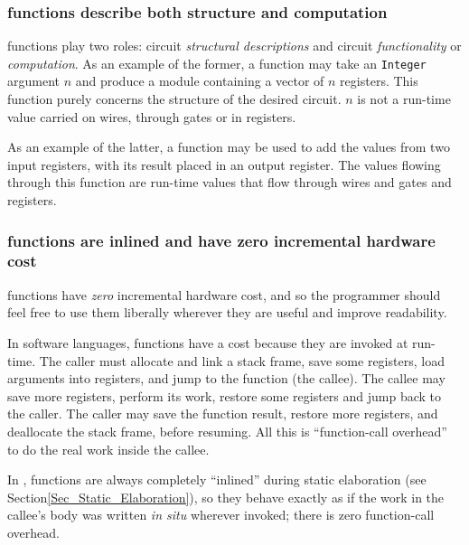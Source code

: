 
\subsubsection{{\BSV} functions describe both structure and computation}


{\BSV} functions play two roles: circuit \emph{structural
descriptions} and circuit \emph{functionality} or \emph{computation}.
As an example of the former, a {\BSV} function may take an
\verb|Integer| argument $n$ and produce a module containing a vector
of $n$ registers.  This function purely concerns the structure of the
desired circuit.  $n$ is not a run-time value carried on wires,
through gates or in registers.

As an example of the latter, a {\BSV} function may be used to add the
values from two input registers, with its result placed in an output
register.  The values flowing through this function are run-time
values that flow through wires and gates and registers.


\subsubsection{{\BSV} functions are inlined and have zero incremental hardware cost}


{\BSV} functions have \emph{zero} incremental hardware cost, and so
the programmer should feel free to use them liberally wherever they
are useful and improve readability.

In software languages, functions have a cost because they are invoked
at run-time.  The caller must allocate and link a stack frame, save
some registers, load arguments into registers, and jump to the
function (the callee).  The callee may save more registers, perform
its work, restore some registers and jump back to the caller.  The
caller may save the function result, restore more registers, and
deallocate the stack frame, before resuming.  All this is
``function-call overhead'' to do the real work inside the callee.

In {\BSV}, functions are always completely ``inlined'' during static
elaboration (see Section\ref{Sec_Static_Elaboration}), so they behave
exactly as if the work in the callee's body was written \emph{in situ}
wherever invoked; there is zero function-call overhead.

